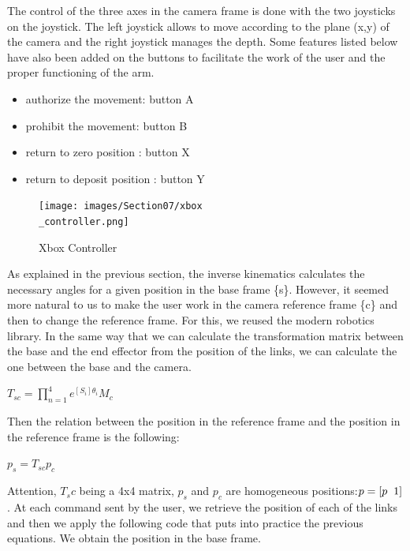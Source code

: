 \bigbreak
The control of the three axes in the camera frame is done with the two joysticks on the joystick. The left joystick allows to move according to the plane (x,y) of the camera and the right joystick manages the depth. Some features listed below have also been added on the buttons to facilitate the work of the user and the proper functioning of the arm.
\begin{itemize}[noitemsep]
    \item authorize the movement: button A
    \item prohibit the movement: button B
    \item return to zero position : button X
    \item return to deposit position : button Y
\end{itemize}

\begin{figure}[ht]
    \centering
    \texttt{[image: images/Section07/xbox\\\_controller.png]}
    \caption{Xbox Controller}
    \label{fig:mesh18}
\end{figure}
\FloatBarrier

\bigbreak
As explained in the previous section, the inverse kinematics calculates the necessary angles for a given position in the base frame \{s\}. However, it seemed more natural to us to make the user work in the camera reference frame \{c\} and then to change the reference frame. For this, we reused the modern robotics library. In the same way that we can calculate the transformation matrix between the base and the end effector from the position of the links, we can calculate the one between the base and the camera. 
\begin{center}
    $T_{sc} =\displaystyle \prod_{n=1}^4e^{[S_i]\theta_i}M_c$
\end{center}

\bigbreak
Then the relation between the position in the reference frame and the position in the reference frame is the following:
\begin{center}
    $p_s = T_{sc}p_c$
\end{center}

\bigbreak
Attention, $T_sc$ being a 4x4 matrix, $p_s$ and $p_c$ are homogeneous positions:$p = [p\hspace{0.2cm}1]$. At each command sent by the user, we retrieve the position of each of the links and then we apply the following code that puts into practice the previous equations. We obtain the position in the base frame.

